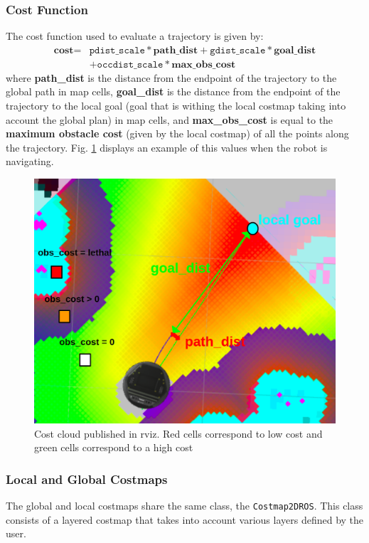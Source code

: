 \subsubsection*{Cost Function}
The cost function used to evaluate a trajectory is given by:
\begin{align*}
        \textbf{cost} = &
   \texttt{pdist\_scale} * \textbf{path\_dist}
   + \texttt{gdist\_scale} * \textbf{goal\_dist}\\
   &+\texttt{occdist\_scale} * \textbf{max\_obs\_cost} 
\end{align*}
where \textbf{path\_dist} is the distance from the endpoint of the trajectory to the global path in map cells, \textbf{goal\_dist} is the distance from the endpoint of the trajectory to the local goal (goal that is withing the local costmap taking into account the global plan)  in map cells, and \textbf{max\_obs\_cost} is equal to the \textbf{maximum obstacle cost} (given by the local costmap) of all the points along the trajectory.
Fig. \ref{fig:costcloud} displays an example of this values when the robot is navigating.
\begin{figure}[!htb]
    \centering
    \includegraphics[width=0.8\linewidth]{imgs/chapter3/costcloud.png}
    \caption[Cost cloud published in rviz]{Cost cloud published in rviz. Red cells correspond to low cost and green cells correspond to a high cost}
    \label{fig:costcloud}
\end{figure}
\subsubsection{Local and Global Costmaps}
The global and local costmaps share the same class, the  \texttt{Costmap2DROS}. This class consists of a layered costmap that takes into account various layers defined by the user.

